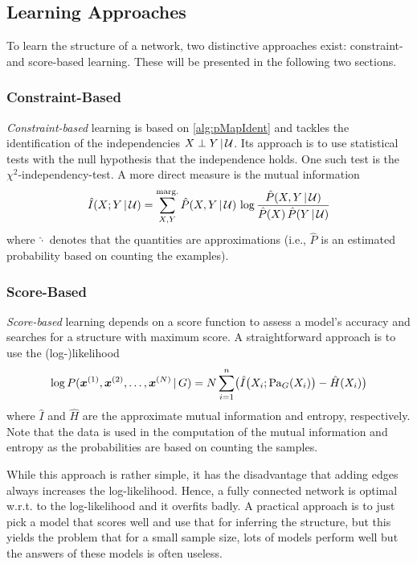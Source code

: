 		\subsection{Learning Approaches}
			To learn the structure of a network, two distinctive approaches exist: constraint- and score-based learning. These will be presented in the following two sections.

			\subsubsection{Constraint-Based}
				\label{subsubsec:constraintBased}

				\emph{Constraint-based} learning is based on \autoref{alg:pMapIdent} and tackles the identification of the independencies \( X \perp Y \,\vert\, \mathcal{U} \). Its approach is to use statistical tests with the null hypothesis that the independence holds. One such test is the \(\chi^2\)-independency-test. A more direct measure is the mutual information
				\begin{equation}
					\hat{I}(X; Y \,\vert\, \mathcal{U}) = \sum_{X, Y}^{\operatorname{marg.}} \hat{P}(X, Y \,\vert\, \mathcal{U}) \, \log\frac{\hat{P}(X, Y \,\vert\, \mathcal{U})}{\hat{P}(X) \, \hat{P}(Y \,\vert\, \mathcal{U})}
				\end{equation}
				where \(\hat{\cdot}\) denotes that the quantities are approximations (i.e., \(\hat{P}\) is an estimated probability based on counting the examples).

			\subsubsection{Score-Based}
				\label{subsubsec:scoreBased}

				\emph{Score-based} learning depends on a score function to assess a model's accuracy and searches for a structure with maximum score. A straightforward approach is to use the (log-)likelihood
				\begin{equation}
					\log P(\bm{x}^{(1)}, \bm{x}^{(2)}, \dots, \bm{x}^{(N)} \,\vert\, G)
					= N \sum_{i = 1}^{n} \bigl( \hat{I}\bigl( X_i; \operatorname{Pa}_G(X_i) \bigr) - \hat{H}(X_i) \bigr)
				\end{equation}
				where \(\hat{I}\) and \(\hat{H}\) are the approximate mutual information and entropy, respectively. Note that the data is used in the computation of the mutual information and entropy as the probabilities are based on counting the samples.

				While this approach is rather simple, it has the disadvantage that adding edges always increases the log-likelihood. Hence, a fully connected network is optimal w.r.t. to the log-likelihood and it overfits badly. A practical approach is to just pick a model that scores well and use that for inferring the structure, but this yields the problem that for a small sample size, lots of models perform well but the answers of these models is often useless.

